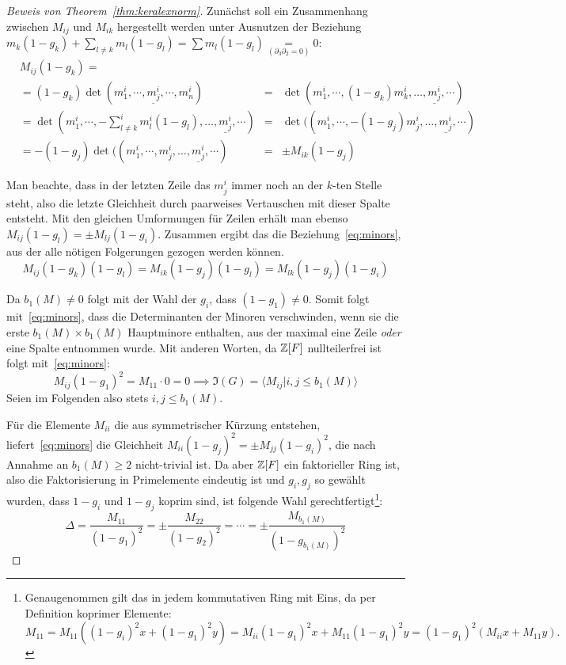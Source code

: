 \begin{proof}[Beweis von Theorem~\ref{thm:keralexnorm}]
	Zunächst soll ein Zusammenhang zwischen $M_{ij}$ und $M_{ik}$ hergestellt werden unter Ausnutzen der Beziehung $m_k(1-g_k)+\sum_{l \neq k}m_l(1-g_l)= \sum m_l(1-g_l) \underset{(\partial_3  \partial_2=0)} =0$:
	\begin{align*}
	&M_{ij}(1-g_k)=\\
	&	=(1-g_k)\det(m^i_1,\cdots,\underline {m^i_j},\cdots,m^i_n)&=& \det(m^i_1,\cdots,(1-g_k)m^i_k,\dots,\underline {m^i_j},\cdots)\\
	&				 =\det(m^i_1,\cdots,-\sum^i_{l \neq k}m^i_l(1-g_l),\dots,\underline {m^i_j},\cdots) &=&\det((m^i_1,\cdots,-(1-g_j)m^i_j,\dots,\underline {m^i_j},\cdots)\\
	&				 =-(1-g_j)\det((m^i_1,\cdots,m^i_j,\dots,\underline {m^i_j},\cdots) &=& \pm M_{ik}(1-g_j)
	\end{align*}

	Man beachte, dass in der letzten Zeile das $m_j^i$ immer noch an der $k$-ten Stelle steht, also die letzte Gleichheit durch paarweises Vertauschen mit dieser Spalte entsteht. Mit den gleichen Umformungen für Zeilen erhält man ebenso $M_{ij}(1-g_l)=\pm M_{lj}(1-g_i)$. Zusammen ergibt das die Beziehung~\eqref{eq:minors}, aus der alle nötigen Folgerungen gezogen werden können.
	\begin{equation}
		M_{ij}(1-g_k)(1-g_l)=M_{ik}(1-g_j)(1-g_l)=M_{lk}(1-g_j)(1-g_i) \label{eq:minors}
	\end{equation}

	Da $b_1(M)\neq 0$ folgt mit der Wahl der $g_i$, dass $(1-g_1)\neq 0$. Somit folgt mit~\eqref{eq:minors}, dass die Determinanten der Minoren verschwinden, wenn sie die erste $b_1(M)\times b_1(M)$ Hauptminore enthalten, aus der maximal eine Zeile \emph{oder} eine Spalte entnommen wurde. Mit anderen Worten, da $\mathbb{Z}[F]$ nullteilerfrei ist folgt mit~\eqref{eq:minors}:
	\[
		M_{ij}(1-g_1)^2 = M_{11}\cdot0=0 \implies \mathfrak I(G)= \langle M_{ij}|i,j \leq b_1(M) \rangle
	\]
	Seien im Folgenden also stets $i,j\leq b_1(M)$.

	Für die Elemente $M_{ii}$ die aus symmetrischer Kürzung entstehen, liefert~\eqref{eq:minors} die Gleichheit $M_{ii}(1-g_j)^2=\pm M_{jj}(1-g_i)^2$, die nach Annahme an $b_1(M)\geq 2$ nicht-trivial ist. Da aber $\mathbb{Z}[F]$ ein faktorieller Ring ist, also die Faktorisierung in Primelemente eindeutig ist und $g_i,g_j$ so gewählt wurden, dass $1-g_i$ und $1-g_j$ koprim sind, ist folgende Wahl gerechtfertigt\footnote{Genaugenommen gilt das in jedem kommutativen Ring mit Eins, da per Definition koprimer Elemente: $M_{11}=M_{11}((1-g_i)^2x +(1-g_1)^2 y)= M_{ii}(1-g_1)^2x + M_{11}(1-g_1)^2y =(1-g_1)^2 (M_{ii}x+ M_{11} y).$}:
	\[
		\Delta = \frac{M_{11}}{(1-g_1)^2} = \pm \frac{M_{22}}{(1-g_2)^2} = \cdots = \pm \frac{M_{b_1(M)}}{(1-g_{b_1(M)})^2}
	\]


\end{proof}
